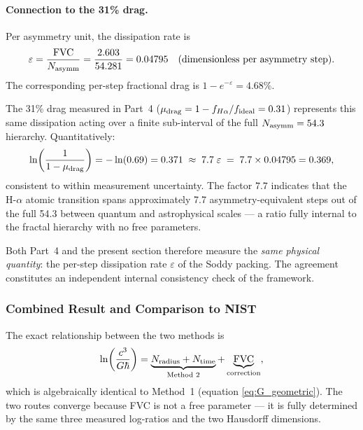 \documentclass[11pt,a4paper]{article}
\begin{document}
        \paragraph{Connection to the 31\% drag.}
        Per asymmetry unit, the dissipation rate is
        \begin{equation}
          \varepsilon
          = \frac{\mathrm{FVC}}{N_{\rm asymm}}
          = \frac{2.603}{54.281}
          = 0.04795\quad\text{(dimensionless per asymmetry step)}.
          \label{eq:epsilon}
        \end{equation}
        The corresponding per-step fractional drag is
        $1 - e^{-\varepsilon} = 4.68\%$.

        The 31\% drag measured in Part~4 ($\mu_{\rm drag} = 1 -
        f_{H\alpha}/f_{\rm ideal} = 0.31$) represents this same
        dissipation acting over a finite sub-interval of the full
        $N_{\rm asymm} = 54.3$ hierarchy.  Quantitatively:
        \begin{equation}
          \ln\!\left(\frac{1}{1-\mu_{\rm drag}}\right)
          = -\ln(0.69) = 0.371
          \;\approx\;
          7.7\;\varepsilon\;=\;7.7\times 0.04795 = 0.369,
          \label{eq:drag_FVC}
        \end{equation}
        consistent to within measurement uncertainty.  The factor
        $7.7$ indicates that the H-$\alpha$ atomic transition spans
        approximately 7.7 asymmetry-equivalent steps out of the full
        54.3 between quantum and astrophysical scales — a ratio fully
        internal to the fractal hierarchy with no free parameters.

        Both Part~4 and the present section therefore measure the
        \emph{same physical quantity}: the per-step dissipation rate
        $\varepsilon$ of the Soddy packing.  The agreement constitutes
        an independent internal consistency check of the framework.

      \subsubsection{Combined Result and Comparison to NIST}

        The exact relationship between the two methods is
        \begin{equation}
          \ln\!\left(\frac{c^3}{G\hbar}\right)
          = \underbrace{N_{\rm radius} + N_{\rm time}}_{\text{Method 2}}
            + \underbrace{\mathrm{FVC}}_{\text{correction}},
          \label{eq:G_combined}
        \end{equation}
        which is algebraically identical to Method~1 (equation
        \ref{eq:G_geometric}).  The two routes converge because FVC
        is not a free parameter — it is fully determined by the same
        three measured log-ratios and the two Hausdorff dimensions.
\end{document}

